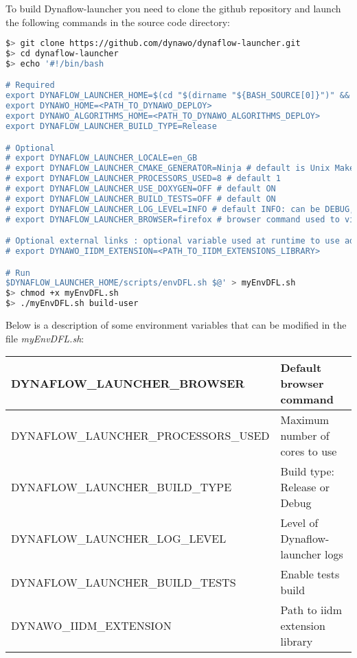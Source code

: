 \documentclass[a4paper, 12pt]{report}
\begin{document}
To build Dynaflow-launcher you need to clone the github repository and launch the following commands in the source code directory:

\begin{lstlisting}[language=bash, columns=fullflexible]
$> git clone https://github.com/dynawo/dynaflow-launcher.git
$> cd dynaflow-launcher
$> echo '#!/bin/bash

# Required
export DYNAFLOW_LAUNCHER_HOME=$(cd "$(dirname "${BASH_SOURCE[0]}")" && pwd)
export DYNAWO_HOME=<PATH_TO_DYNAWO_DEPLOY>
export DYNAWO_ALGORITHMS_HOME=<PATH_TO_DYNAWO_ALGORITHMS_DEPLOY>
export DYNAFLOW_LAUNCHER_BUILD_TYPE=Release

# Optional
# export DYNAFLOW_LAUNCHER_LOCALE=en_GB
# export DYNAFLOW_LAUNCHER_CMAKE_GENERATOR=Ninja # default is Unix Makefiles
# export DYNAFLOW_LAUNCHER_PROCESSORS_USED=8 # default 1
# export DYNAFLOW_LAUNCHER_USE_DOXYGEN=OFF # default ON
# export DYNAFLOW_LAUNCHER_BUILD_TESTS=OFF # default ON
# export DYNAFLOW_LAUNCHER_LOG_LEVEL=INFO # default INFO: can be DEBUG, INFO, WARN, ERROR
# export DYNAFLOW_LAUNCHER_BROWSER=firefox # browser command used to visualize test coverage. default: firefox

# Optional external links : optional variable used at runtime to use additional iidm extension
# export DYNAWO_IIDM_EXTENSION=<PATH_TO_IIDM_EXTENSIONS_LIBRARY>

# Run
$DYNAFLOW_LAUNCHER_HOME/scripts/envDFL.sh $@' > myEnvDFL.sh
$> chmod +x myEnvDFL.sh
$> ./myEnvDFL.sh build-user
\end{lstlisting}

Below is a description of some environment variables that can be modified in the file \textit{myEnvDFL.sh}:

\begin{center}
\begin{tabular}{|l|l|}
  \hline
   \tiny{DYNAFLOW\_LAUNCHER\_BROWSER} & \small{Default browser command} \\
  \hline
   \tiny{DYNAFLOW\_LAUNCHER\_PROCESSORS\_USED} & \small{Maximum number of cores to use} \\
  \hline
   \tiny{DYNAFLOW\_LAUNCHER\_BUILD\_TYPE} & \small{Build type: Release or Debug} \\
  \hline
   \tiny{DYNAFLOW\_LAUNCHER\_LOG\_LEVEL} & \small{Level of Dynaflow-launcher logs} \\
  \hline
   \tiny{DYNAFLOW\_LAUNCHER\_BUILD\_TESTS} & \small{Enable tests build} \\
  \hline
   \tiny{DYNAWO\_IIDM\_EXTENSION} & \small{Path to iidm extension library} \\
  \hline
\end{tabular}
\end{center}
\end{document}
